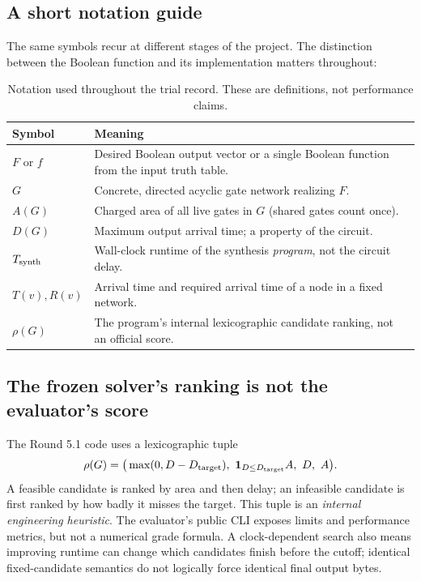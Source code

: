 \documentclass[a4paper,10pt]{article}
\theoremstyle{definition}
\theoremstyle{remark}
\begin{document}
\subsection{A short notation guide}
The same symbols recur at different stages of the project. The distinction between the Boolean function and its implementation matters throughout:
\begin{table}[H]
\centering\small
\caption{Notation used throughout the trial record. These are definitions, not performance claims.}\label{tab:notation}
\begin{tabularx}{\textwidth}{@{}p{}X@{}}\toprule
\textbf{Symbol} & \textbf{Meaning}\\\midrule
$F$ or $f$ & Desired Boolean output vector or a single Boolean function from the input truth table.\\
$G$ & Concrete, directed acyclic gate network realizing $F$.\\
$A(G)$ & Charged area of all live gates in $G$ (shared gates count once).\\
$D(G)$ & Maximum output arrival time; a property of the circuit.\\
$T_{\rm synth}$ & Wall-clock runtime of the synthesis \emph{program}, not the circuit delay.\\
$T(v),R(v)$ & Arrival time and required arrival time of a node in a fixed network.\\
$\rho(G)$ & The program's internal lexicographic candidate ranking, not an official score.\\
\bottomrule\end{tabularx}
\end{table}

\subsection{The frozen solver's ranking is not the evaluator's score}
The Round 5.1 code uses a lexicographic tuple
\[
\rho(G)=\big(\max(0,D-D_{\rm target}),\ \mathbf1_{D\le D_{\rm target}}A,\ D,\ A\big).
\]
A feasible candidate is ranked by area and then delay; an infeasible candidate is first ranked by how badly it misses the target. This tuple is an \emph{internal engineering heuristic}. The evaluator's public CLI exposes limits and performance metrics, but not a numerical grade formula. A clock-dependent search also means improving runtime can change which candidates finish before the cutoff; identical fixed-candidate semantics do not logically force identical final output bytes.
\end{document}
